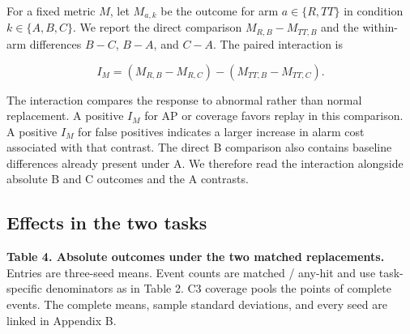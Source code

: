 \documentclass[
  american,
]{article}
\begin{document}
For a fixed metric \(M\), let \(M_{a,k}\) be the outcome for arm
\(a\in\{R,TT\}\) in condition \(k\in\{A,B,C\}\). We report the direct
comparison \(M_{R,B}-M_{TT,B}\) and the within-arm differences \(B-C\),
\(B-A\), and \(C-A\). The paired interaction is

\[
I_M=(M_{R,B}-M_{R,C})-(M_{TT,B}-M_{TT,C}).
\]

The interaction compares the response to abnormal rather than normal
replacement. A positive \(I_M\) for AP or coverage favors replay in this
comparison. A positive \(I_M\) for false positives indicates a larger
increase in alarm cost associated with that contrast. The direct B
comparison also contains baseline differences already present under A.
We therefore read the interaction alongside absolute B and C outcomes
and the A contrasts.

\subsection{Effects in the two tasks}\label{effects-in-the-two-tasks}

\textbf{Table 4. Absolute outcomes under the two matched replacements.}
Entries are three-seed means. Event counts are matched / any-hit and use
task-specific denominators as in Table 2. C3 coverage pools the points
of complete events. The complete means, sample standard deviations, and
every seed are linked in Appendix B.
\end{document}
